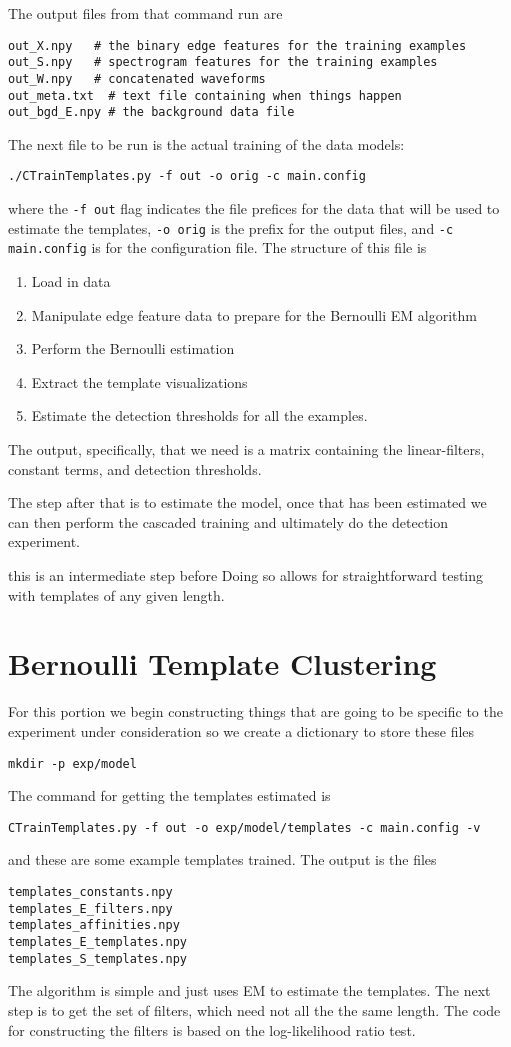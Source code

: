 \documentclass{article}
\begin{document}
  The output files from that command
run are
\begin{verbatim}
out_X.npy   # the binary edge features for the training examples
out_S.npy   # spectrogram features for the training examples
out_W.npy   # concatenated waveforms
out_meta.txt  # text file containing when things happen
out_bgd_E.npy # the background data file
\end{verbatim}
The next file to be run is the actual training of the data models:
\begin{verbatim}
./CTrainTemplates.py -f out -o orig -c main.config
\end{verbatim}
where the \texttt{-f out} flag indicates the file prefices for the
data that will be used to estimate the templates, 
\texttt{-o orig} is the prefix for the output files,
and \texttt{-c main.config} is for the configuration file.  The 
structure of this file is
\begin{enumerate}
\item Load in data
\item Manipulate edge feature data to prepare for the Bernoulli EM algorithm
\item Perform the Bernoulli estimation
\item Extract the template visualizations
\item Estimate the detection thresholds for all the examples.
\end{enumerate}
The output, specifically, that we need  is a matrix containing
the linear-filters, constant terms, and detection thresholds.  


The step after that is to estimate the model, once that has been
estimated we can then perform the cascaded training and ultimately
do the detection experiment.

 this is an intermediate step before   Doing so allows for straightforward testing with templates of any given length.

\section{Bernoulli Template Clustering}

For this portion we begin constructing things that are going to
be specific to the experiment under consideration
so we create a dictionary to store these files
\begin{verbatim}
mkdir -p exp/model
\end{verbatim}

The command for getting the templates estimated is
\begin{verbatim}
CTrainTemplates.py -f out -o exp/model/templates -c main.config -v
\end{verbatim}
and these are some example templates trained. The output is
the files
\begin{verbatim}
templates_constants.npy
templates_E_filters.npy
templates_affinities.npy
templates_E_templates.npy
templates_S_templates.npy
\end{verbatim}
  The algorithm is simple and just uses
EM to estimate the templates.  The next step is to get the set of filters, which need not all the 
the same length.  The code for constructing the filters is
based on the log-likelihood ratio test.
\end{document}
